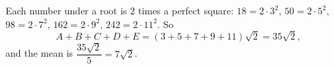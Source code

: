 Each number under a root is $2$ times a perfect square: $18=2\cdot3^2$, $50=2\cdot5^2$, $98=2\cdot7^2$, $162=2\cdot9^2$, $242=2\cdot11^2$. So
\[A+B+C+D+E=(3+5+7+9+11)\sqrt2=35\sqrt2,\]
and the mean is $\dfrac{35\sqrt2}{5}=\boxed{7\sqrt2}$.
